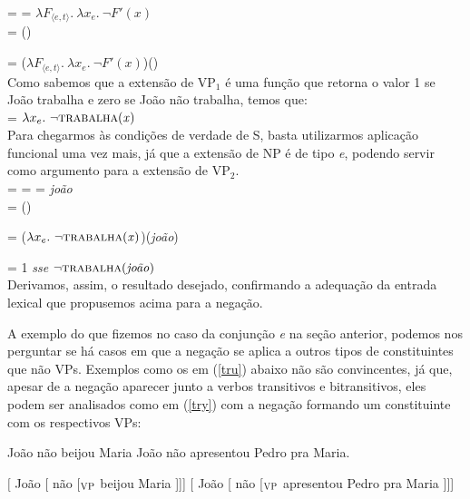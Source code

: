 \n {} =  = $\lambda F_{\langle e,t\rangle}.\
\lambda x_{e}.\ \neg F'(x)$\\

\n {} = ()

\n {} = ($\lambda F_{\langle e,t\rangle}.\ \lambda x_{e}.\
\neg F'(x)$)() \\

\n Como sabemos que a extensão de VP$_{1}$ é uma função que retorna o valor 1 se João trabalha
e zero se João não trabalha, temos que:\\

\n {} = $\lambda x_{e}.\ \neg\predica{trabalha}{x}$\\

\n Para chegarmos às condi\-çõ\-es de verdade de S, basta
utilizarmos aplica\-ção funcional uma vez mais, já que a extensão
de NP é de tipo \textit{e}, podendo servir como argumento para a
extensão de VP$_{2}$.\\

\n {} =  =  = \textit{joão}\\

\n {} = (\den{NP})

\n = ($\lambda x_{e}.\ \neg\predica{trabalha}{x}$)(\textit{joão})

\n = 1 \textit{sse} $\neg\text{\textsc{trabalha}(\textit{joão})}$\\

\n Derivamos, assim, o resultado desejado, confirmando a adequa\-ção
da entrada lexical que propusemos acima para a nega\-ção.

A exemplo do que fizemos no caso da conjun\-ção \textit{e} na se\-ção
anterior, podemos nos perguntar se há casos em que a nega\-ção se
aplica a outros tipos de constituintes que não VPs. Exemplos como
os em (\ref{tru}) abaixo não são convincentes, já que, apesar de a
nega\-ção aparecer junto a verbos transitivos e bitransitivos, eles
podem ser analisados como em (\ref{try}) com a nega\-ção formando
um constituinte com os respectivos VPs:

\begin{exe}
\ex\label{tru}
\begin{xlist}
\ex João não beijou Maria\label{trua}
\ex João não apresentou Pedro pra Maria.\label{trub}
\end{xlist}
\end{exe}

\begin{exe}
\ex\label{try}
\begin{xlist}
\ex $[$ João [ não [$_{\text{\textsc{VP}}}$ beijou Maria ]]]\label{trya}
\ex $[$ João [ não [$_{\text{\textsc{VP}}}$ apresentou Pedro pra Maria ]]]\label{tryb}
\end{xlist}
\end{exe}

